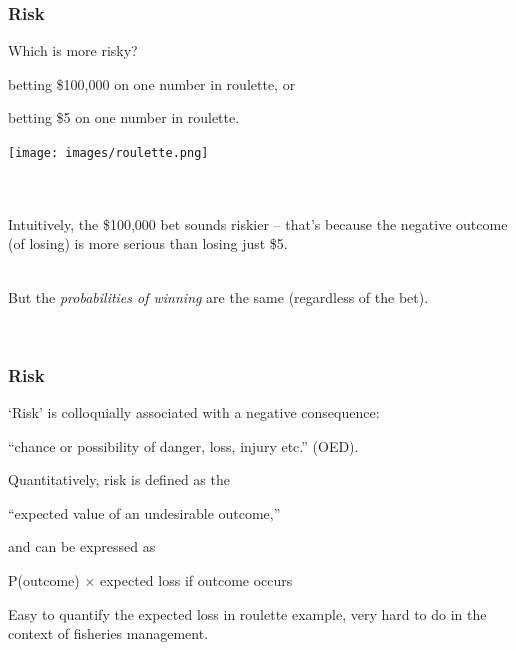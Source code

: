 \begin{frame}
\frametitle{Risk}

\begin{minipage}{8cm}
Which is more risky?
\bi
 \item betting \$100,000 on one number in roulette, or
 \item betting \$5 on one number in roulette.
\ei
\end{minipage}
\begin{minipage}{4cm}
  \texttt{[image: images/roulette.png]}
\end{minipage}

\pause

~\\

~\\

Intuitively, the \$100,000 bet sounds riskier -- that's because the negative
outcome (of losing) is more serious than losing just \$5.

~\\

But the \alert{\emph{probabilities of winning}} are the same (regardless of the bet).

~\\

\end{frame}

\begin{frame}
\frametitle{Risk}

`Risk' is colloquially associated with a negative consequence:

\bc
\alert{``chance or possibility of danger, loss, injury etc.'' (OED).}
\ec

Quantitatively, risk is defined as the

\bc
\alert{``expected value of an undesirable outcome,''}
\ec

and can be expressed as

\bc
P(outcome) $\times$ expected loss if outcome occurs
\ec

Easy to \alert{quantify the expected loss} in roulette example, very hard to do
in the context of fisheries management.

\end{frame}




